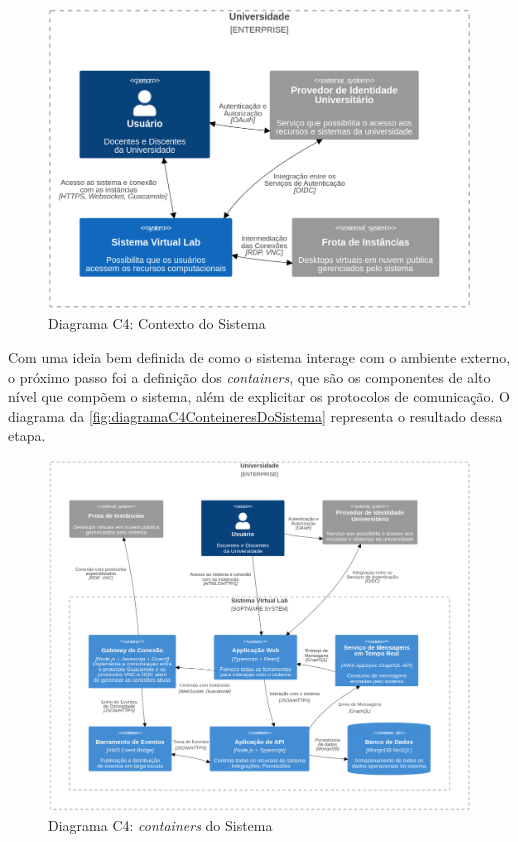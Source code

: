 \begin{figure}[H]
\caption{Diagrama C4: Contexto do Sistema}
\label{fig:diagramaC4ContextoDoSistema}
\includegraphics[width=\textwidth]{capitulos/2-metodologia/files/c4-system-context.png}
\end{figure}

Com uma ideia bem definida de como o sistema interage com o ambiente externo, o próximo passo foi a definição dos \textit{containers}, que são os componentes de alto nível que compõem o sistema, além de explicitar os protocolos de comunicação. O diagrama da \autoref{fig:diagramaC4ConteineresDoSistema} representa o resultado dessa etapa.

\begin{figure}[H]
\caption{Diagrama C4: \textit{containers} do Sistema}
\label{fig:diagramaC4ConteineresDoSistema}
\includegraphics[width=\textwidth]{capitulos/2-metodologia/files/c4-container.png}
\end{figure}

